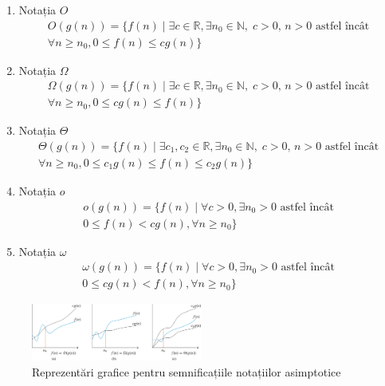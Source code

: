 \documentclass{article}
\begin{document}
\begin{enumerate}
	\item Notația $O$
	      \begin{multline}
		      O(g(n)) = \{ f(n) \mid \exists c \in \mathbb{R},
		      \exists n_0 \in \mathbb{N},\; c > 0,\, n > 0 \text{ astfel încât } \\
		      \forall n \geq n_0, 0 \le f(n) \leq c g(n) \}
	      \end{multline}

	\item Notația $\Omega$
	      \begin{multline}
		      \Omega(g(n)) = \{ f(n) \mid \exists c \in \mathbb{R},
		      \exists n_0 \in \mathbb{N},\; c > 0,\, n > 0 \text{ astfel încât } \\
		      \forall n \geq n_0, 0 \le c g(n) \leq f(n) \}
	      \end{multline}

	\item Notația $\Theta$
	      \begin{multline}
		      \Theta(g(n)) = \{ f(n) \mid \exists c_1, c_2 \in \mathbb{R},
		      \exists n_0 \in \mathbb{N},\; c > 0,\, n > 0 \text{ astfel încât } \\
		      \forall n \geq n_0, 0 \le c_1 g(n) \leq f(n) \leq c_2 g(n) \}
	      \end{multline}

	\item Notația $o$
	      \begin{multline}
		      o(g(n)) = \{ f(n) \mid \forall c > 0,
		      \exists n_0 > 0 \text{ astfel încât } \\
		      0 \leq f(n) < c g(n), \forall n \geq n_0 \}
	      \end{multline}

	\item Notația $\omega$
	      \begin{multline}
		      \omega(g(n)) = \{ f(n) \mid \forall c > 0,
		      \exists n_0 > 0 \text{ astfel încât } \\
		      0 \leq c g(n) < f(n), \forall n \geq n_0 \}
	      \end{multline}
\end{enumerate}

\begin{figure}[H]
	\centering
	\includegraphics[width=0.5\textwidth]{clrs-o-omega-theta.png}
	\caption{Reprezentări grafice pentru semnificațiile notațiilor asimptotice}
	\label{fig:o_omega_theta}
\end{figure}
\end{document}
